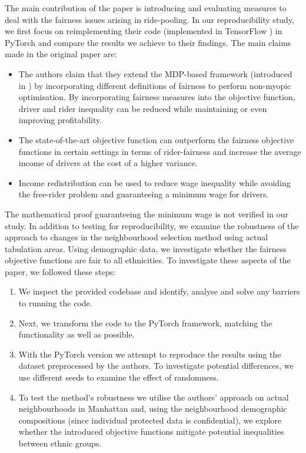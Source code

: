 The main contribution of the paper is introducing and evaluating measures to deal with the fairness issues arising in ride-pooling. In our reproducibility study, we first focus on reimplementing their code (implemented in TensorFlow \cite{tensorflow}) in PyTorch \cite{pytorch} and compare the results we achieve to their findings. The main claims made in the original paper are:
\begin{itemize}
    \item The authors claim that they extend the MDP-based framework (introduced in \citet{shah20}) by incorporating different definitions of fairness to perform non-myopic optimisation. By incorporating fairness measures into the objective function, driver and rider inequality can be reduced while maintaining or even improving profitability.
    \item The state-of-the-art objective function \cite{shah20} can outperform the fairness objective functions in certain settings in terms of rider-fairness and increase the average income of drivers at the cost of a higher variance.
    \item Income redistribution can be used to reduce wage inequality while avoiding the free-rider problem and guaranteeing a minimum wage for drivers.
\end{itemize}
The mathematical proof guaranteeing the minimum wage is not verified in our study. In addition to testing for reproducibility, we examine the robustness of the approach to changes in the neighbourhood selection method using actual tabulation areas. Using demographic data, we investigate whether the fairness objective functions are fair to all ethnicities. To investigate these aspects of the paper, we followed these steps:
\begin{enumerate}
    \item We inspect the provided codebase and identify, analyse and solve any barriers to running the code.
    \item Next, we transform the code to the PyTorch framework, matching the functionality as well as possible.
    \item With the PyTorch version we attempt to reproduce the results using the dataset preprocessed by the authors. To investigate potential differences, we use different seeds to examine the effect of randomness.
    \item To test the method's robustness we utilise the authors' approach on actual neighbourhoods in Manhattan and, using the neighbourhood demographic compositions (since individual protected data is confidential), we explore whether the introduced objective functions mitigate potential inequalities between ethnic groups.

\end{enumerate}



